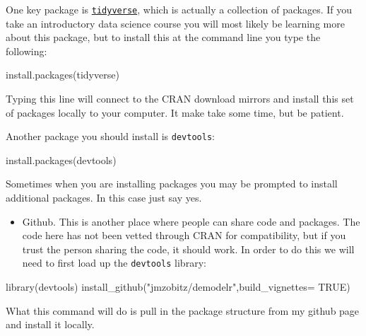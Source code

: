 \documentclass[
]{book}
\newenvironment{Shaded}{\begin{snugshade}}{\end{snugshade}}
\newcommand{\AttributeTok}[1]{\textcolor[rgb]{0.77,0.63,0.00}{#1}}
\newcommand{\ConstantTok}[1]{\textcolor[rgb]{0.00,0.00,0.00}{#1}}
\newcommand{\FunctionTok}[1]{\textcolor[rgb]{0.00,0.00,0.00}{#1}}
\newcommand{\NormalTok}[1]{#1}
\newcommand{\StringTok}[1]{\textcolor[rgb]{0.31,0.60,0.02}{#1}}
\providecommand{\tightlist}{%
  \setlength{\itemsep}{0pt}\setlength{\parskip}{0pt}}
\theoremstyle{definition}
\theoremstyle{definition}
\theoremstyle{definition}
\theoremstyle{remark}
\begin{document}
One key package is \href{https://www.tidyverse.org/}{\texttt{tidyverse}}, which is actually a collection of packages. If you take an introductory data science course you will most likely be learning more about this package, but to install this at the command line you type the following:

\begin{Shaded}
\begin{Highlighting}[]
\FunctionTok{install.packages}\NormalTok{(}\StringTok{\textquotesingle{}tidyverse\textquotesingle{}}\NormalTok{)}
\end{Highlighting}
\end{Shaded}

Typing this line will connect to the CRAN download mirrors and install this set of packages locally to your computer. It make take some time, but be patient.

Another package you should install is \texttt{devtools}:

\begin{Shaded}
\begin{Highlighting}[]
\FunctionTok{install.packages}\NormalTok{(}\StringTok{\textquotesingle{}devtools\textquotesingle{}}\NormalTok{)}
\end{Highlighting}
\end{Shaded}

Sometimes when you are installing packages you may be prompted to install additional packages. In this case just say yes.

\begin{itemize}
\tightlist
\item
  Github. This is another place where people can share code and packages. The code here has not been vetted through CRAN for compatibility, but if you trust the person sharing the code, it should work. In order to do this we will need to first load up the \texttt{devtools} library:
\end{itemize}

\begin{Shaded}
\begin{Highlighting}[]
\FunctionTok{library}\NormalTok{(devtools)}
\FunctionTok{install\_github}\NormalTok{(}\StringTok{"jmzobitz/demodelr"}\NormalTok{,}\AttributeTok{build\_vignettes=} \ConstantTok{TRUE}\NormalTok{)}
\end{Highlighting}
\end{Shaded}

What this command will do is pull in the package structure from my github page and install it locally.
\end{document}

